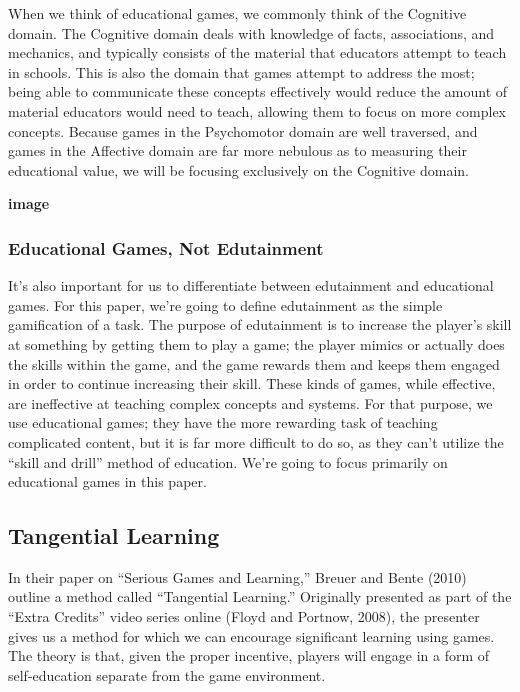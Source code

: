 \documentclass[12pt]{report}
\begin{document}
			When we think of educational games, we commonly think of the Cognitive domain. The Cognitive domain deals with knowledge of facts, associations, and mechanics, and typically consists of the material that educators attempt to teach in schools. This is also the domain that games attempt to address the most; being able to communicate these concepts effectively would reduce the amount of material educators would need to teach, allowing them to focus on more complex concepts. Because games in the Psychomotor domain are well traversed, and games in the Affective domain are far more nebulous as to measuring their educational value, we will be focusing exclusively on the Cognitive domain.



			\textbf{image}

			\subsubsection{Educational Games, Not Edutainment}
				It's also important for us to differentiate between edutainment and educational games. For this paper, we're going to define edutainment as the simple gamification of a task. The purpose of edutainment is to increase the player's skill at something by getting them to play a game; the player mimics or actually does the skills within the game, and the game rewards them and keeps them engaged in order to continue increasing their skill. These kinds of games, while effective, are ineffective at teaching complex concepts and systems. For that purpose, we use educational games; they have the more rewarding task of teaching complicated content, but it is far more difficult to do so, as they can't utilize the “skill and drill” method of education. We're going to focus primarily on educational games in this paper.

	\subsection{Tangential Learning}

		In their paper on “Serious Games and Learning,” Breuer and Bente (2010) outline a method called “Tangential Learning.” Originally presented as part of the “Extra Credits” video series online (Floyd and Portnow, 2008), the presenter gives us a method for which we can encourage significant learning using games. The theory is that, given the proper incentive, players will engage in a form of self-education separate from the game environment.
		
\end{document}
